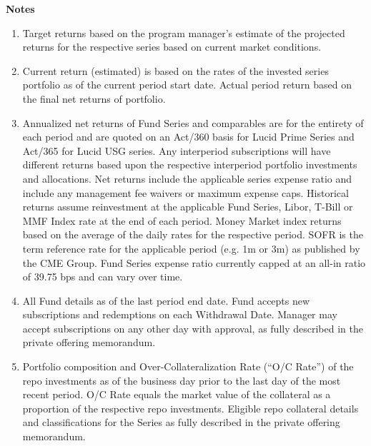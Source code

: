 \documentclass[9pt]{article}
\begin{document}
    \onecolumn



    \pagebreak

    \footnotesize
    \noindent\textbf{\color{lucid_blue}Notes}

    \begin{enumerate}
        \item Target returns based on the program manager's estimate of the projected returns for the respective series based on current market conditions.

        \item Current return (estimated) is based on the rates of the invested series portfolio as of the current period start date. Actual period return based on the final net returns of portfolio.

        \item Annualized net returns of Fund Series and comparables are for the entirety of each period and are quoted on an Act/360 basis for Lucid Prime Series and Act/365 for Lucid USG series. Any interperiod subscriptions will have different returns based upon the respective interperiod portfolio investments and allocations. Net returns include the applicable series expense ratio and include any management fee waivers or maximum expense caps. Historical returns assume reinvestment at the applicable Fund Series, Libor, T-Bill or MMF Index rate at the end of each period. Money Market index returns based on the average of the daily rates for the respective period. SOFR is the term reference rate for the applicable period (e.g. 1m or 3m) as published by the CME Group. Fund Series expense ratio currently capped at an all-in ratio of 39.75 bps and can vary over time.

        \item All Fund details as of the last period end date. Fund accepts new subscriptions and redemptions on each Withdrawal Date. Manager may accept subscriptions on any other day with approval, as fully described in the private offering memorandum.

        \item Portfolio composition and Over-Collateralization Rate (``O/C Rate'') of the repo investments as of the business day prior to the last day of the most recent period. O/C Rate equals the market value of the collateral as a proportion of the respective repo investments. Eligible repo collateral details and classifications for the Series as fully described in the private offering memorandum.

    \end{enumerate}
\end{document}
